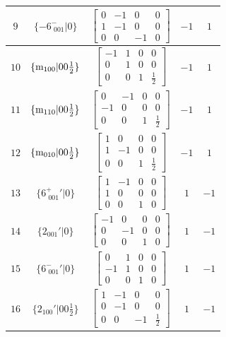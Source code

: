 \documentclass[fleqn,8pt]{jsarticle}
\begin{document}
\begin{longtable}{ccccc}
$ 9 $ & $ \{-6^{-}_{\,\,001}|0\} $ & $ \begin{bmatrix} 0 & -1 & 0 & 0 \\ 1 & -1 & 0 & 0 \\ 0 & 0 & -1 & 0 \end{bmatrix} $ & $ -1 $ & $ 1 $ \\ \hline
$ 10 $ & $ \{{\rm m}_{100}|0 0 \frac{1}{2}\} $ & $ \begin{bmatrix} -1 & 1 & 0 & 0 \\ 0 & 1 & 0 & 0 \\ 0 & 0 & 1 & \frac{1}{2} \end{bmatrix} $ & $ -1 $ & $ 1 $ \\ \hline
$ 11 $ & $ \{{\rm m}_{110}|0 0 \frac{1}{2}\} $ & $ \begin{bmatrix} 0 & -1 & 0 & 0 \\ -1 & 0 & 0 & 0 \\ 0 & 0 & 1 & \frac{1}{2} \end{bmatrix} $ & $ -1 $ & $ 1 $ \\ \hline
$ 12 $ & $ \{{\rm m}_{010}|0 0 \frac{1}{2}\} $ & $ \begin{bmatrix} 1 & 0 & 0 & 0 \\ 1 & -1 & 0 & 0 \\ 0 & 0 & 1 & \frac{1}{2} \end{bmatrix} $ & $ -1 $ & $ 1 $ \\ \hline
$ 13 $ & $ \{6^{+}_{\,\,001}{}'|0\} $ & $ \begin{bmatrix} 1 & -1 & 0 & 0 \\ 1 & 0 & 0 & 0 \\ 0 & 0 & 1 & 0 \end{bmatrix} $ & $ 1 $ & $ -1 $ \\ \hline
$ 14 $ & $ \{2{}_{001}{}'|0\} $ & $ \begin{bmatrix} -1 & 0 & 0 & 0 \\ 0 & -1 & 0 & 0 \\ 0 & 0 & 1 & 0 \end{bmatrix} $ & $ 1 $ & $ -1 $ \\ \hline
$ 15 $ & $ \{6^{-}_{\,\,001}{}'|0\} $ & $ \begin{bmatrix} 0 & 1 & 0 & 0 \\ -1 & 1 & 0 & 0 \\ 0 & 0 & 1 & 0 \end{bmatrix} $ & $ 1 $ & $ -1 $ \\ \hline
$ 16 $ & $ \{2{}_{100}{}'|0 0 \frac{1}{2}\} $ & $ \begin{bmatrix} 1 & -1 & 0 & 0 \\ 0 & -1 & 0 & 0 \\ 0 & 0 & -1 & \frac{1}{2} \end{bmatrix} $ & $ 1 $ & $ -1 $ \\ \hline

\end{longtable}
\end{document}
